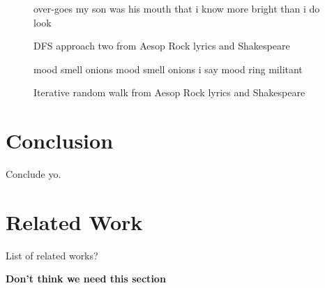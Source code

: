 \documentclass[]{article}
\newcommand{\comment}[1]
{\par {\bfseries \color{green} #1 \par}}
\begin{document}
\begin{figure}[H]
	\centering
	over-goes my son \break
	was his mouth that i know more \break
	bright than i do look
	\caption{DFS approach two from Aesop Rock lyrics and Shakespeare}
	\label{fig:DFSTwoAesopShakespeare}
\end{figure}

\begin{figure}[H]
	\centering
	mood smell onions \break
	mood smell onions i say \break
	mood ring militant
	\caption{Iterative random walk from Aesop Rock lyrics and Shakespeare}
	\label{fig:IRWAesopShakespeare}
\end{figure}

\section{Conclusion}
Conclude yo.

\section{Related Work}
List of related works?
\comment{Don't think we need this section}



\end{document}

